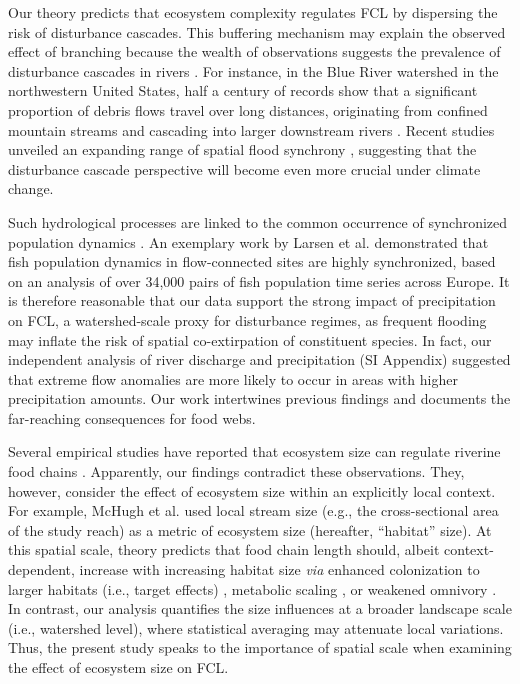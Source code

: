 \documentclass[11pt, class=article, crop=false]{standalone}
\begin{document}
Our theory predicts that ecosystem complexity regulates FCL by dispersing the risk of disturbance cascades.
This buffering mechanism may explain the observed effect of branching because the wealth of observations suggests the prevalence of disturbance cascades in rivers \citep{swanson_flood_1998, nakamura_disturbance_2000, berghuijs_growing_2019, sarremejane_drought_2021, sharma_spatial_2024}.
For instance, in the Blue River watershed in the northwestern United States, half a century of records show that a significant proportion of debris flows travel over long distances, originating from confined mountain streams and cascading into larger downstream rivers \citep{nakamura_disturbance_2000}.
Recent studies unveiled an expanding range of spatial flood synchrony \citep{berghuijs_growing_2019, sharma_spatial_2024}, suggesting that the disturbance cascade perspective will become even more crucial under climate change.

Such hydrological processes are linked to the common occurrence of synchronized population dynamics \citep{sarremejane_drought_2021, larsen_geography_2021}.
An exemplary work by Larsen et al. \citep{larsen_geography_2021} demonstrated that fish population dynamics in flow-connected sites are highly synchronized, based on an analysis of over 34,000 pairs of fish population time series across Europe.
It is therefore reasonable that our data support the strong impact of precipitation on FCL, a watershed-scale proxy for disturbance regimes, as frequent flooding may inflate the risk of spatial co-extirpation of constituent species.
In fact, our independent analysis of river discharge and precipitation (SI Appendix) suggested that extreme flow anomalies are more likely to occur in areas with higher precipitation amounts.
Our work intertwines previous findings and documents the far-reaching consequences for food webs.

Several empirical studies have reported that ecosystem size can regulate riverine food chains \citep{mchugh_dual_2010, sabo_role_2010}.
Apparently, our findings contradict these observations.
They, however, consider the effect of ecosystem size within an explicitly local context.
For example, McHugh et al. \citep{mchugh_dual_2010} used local stream size (e.g., the cross-sectional area of the study reach) as a metric of ecosystem size (hereafter, ``habitat'' size).
At this spatial scale, theory predicts that food chain length should, albeit context-dependent, increase with increasing habitat size \textit{via} enhanced colonization to larger habitats (i.e., target effects) \citep{shibasaki_food_2024}, metabolic scaling \citep{mcintosh_capacity_2018}, or weakened omnivory \citep{ward_mechanistic_2017}.
In contrast, our analysis quantifies the size influences at a broader landscape scale (i.e., watershed level), where statistical averaging may attenuate local variations. 
Thus, the present study speaks to the importance of spatial scale when examining the effect of ecosystem size on FCL.
\end{document}
